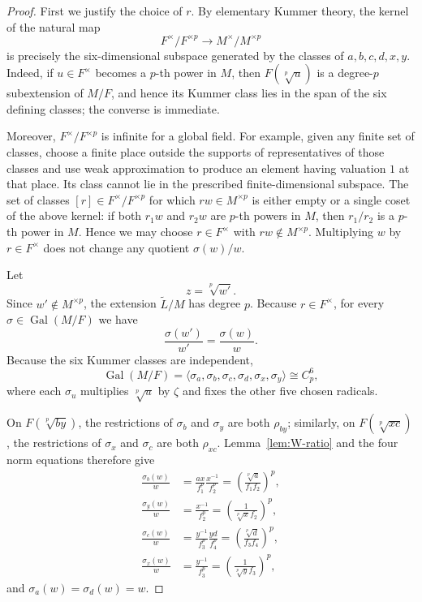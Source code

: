 \documentclass[12pt]{amsart}
\theoremstyle{definition}
\theoremstyle{remark}
\DeclareMathOperator{\Gal}{Gal}
\begin{document}
\begin{proof}
First we justify the choice of $r$. By elementary Kummer theory, the kernel
of the natural map
\[
 F^\times/F^{\times p}\longrightarrow M^\times/M^{\times p}
\]
is precisely the six-dimensional subspace generated by the classes of
$a,b,c,d,x,y$. Indeed, if $u\in F^\times$ becomes a $p$-th power in $M$,
then $F(\sqrt[p]{u})$ is a degree-$p$ subextension of $M/F$, and hence its
Kummer class lies in the span of the six defining classes; the converse is
immediate.

Moreover, $F^\times/F^{\times p}$ is infinite for a global field. For
example, given any finite set of classes, choose a finite place outside the
supports of representatives of those classes and use weak approximation to
produce an element having valuation $1$ at that place. Its class cannot lie
in the prescribed finite-dimensional subspace. The set of classes
$[r]\in F^\times/F^{\times p}$ for which $rw\in M^{\times p}$ is either
empty or a single coset of the above kernel: if both $r_1w$ and $r_2w$ are
$p$-th powers in $M$, then $r_1/r_2$ is a $p$-th power in $M$. Hence we may
choose $r\in F^\times$ with $rw\notin M^{\times p}$. Multiplying $w$ by
$r\in F^\times$ does not change any quotient $\sigma(w)/w$.

Let
\[
 z=\sqrt[p]{w'}.
\]
Since $w'\notin M^{\times p}$, the extension $\widetilde L/M$ has degree
$p$. Because $r\in F^\times$, for every $\sigma\in\Gal(M/F)$ we have
\[
 \frac{\sigma(w')}{w'}=\frac{\sigma(w)}{w}.
\]
Because the six Kummer classes are independent,
\[
 \Gal(M/F)=
 \langle\sigma_a,\sigma_b,\sigma_c,\sigma_d,\sigma_x,\sigma_y\rangle
 \cong C_p^6,
\]
where each $\sigma_u$ multiplies $\sqrt[p]{u}$ by $\zeta$ and fixes the
other five chosen radicals.

On $F(\sqrt[p]{by})$, the restrictions of $\sigma_b$ and $\sigma_y$ are both
$\rho_{by}$; similarly, on $F(\sqrt[p]{xc})$, the restrictions of
$\sigma_x$ and $\sigma_c$ are both $\rho_{xc}$. Lemma~\ref{lem:W-ratio}
and the four norm equations therefore give
\begin{align*}
 \frac{\sigma_b(w)}{w}
 &=\frac{ax}{f_1^p}\frac{x^{-1}}{f_2^p}
 =\left(\frac{\sqrt[p]{a}}{f_1f_2}\right)^p,\\
 \frac{\sigma_y(w)}{w}
 &=\frac{x^{-1}}{f_2^p}
 =\left(\frac{1}{\sqrt[p]{x}f_2}\right)^p,\\
 \frac{\sigma_c(w)}{w}
 &=\frac{y^{-1}}{f_3^p}\frac{yd}{f_4^p}
 =\left(\frac{\sqrt[p]{d}}{f_3f_4}\right)^p,\\
 \frac{\sigma_x(w)}{w}
 &=\frac{y^{-1}}{f_3^p}
 =\left(\frac{1}{\sqrt[p]{y}f_3}\right)^p,
\end{align*}
and $\sigma_a(w)=\sigma_d(w)=w$.


\end{proof}
\end{document}

